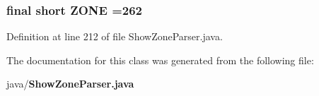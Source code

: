 \subsubsection[{Z\+O\+N\+E}]{\setlength{\rightskip}{0pt plus 5cm}final short Z\+O\+N\+E =262\hspace{0.3cm}{\ttfamily [static]}}\label{classorg_1_1smallfoot_1_1parser_1_1zone_1_1ShowZoneParser_a8ddd6c0fce0f972519976a2c9ca1aadd}


Definition at line 212 of file Show\+Zone\+Parser.\+java.



The documentation for this class was generated from the following file\+:\begin{DoxyCompactItemize}
\item 
java/{\bf Show\+Zone\+Parser.\+java}\end{DoxyCompactItemize}
